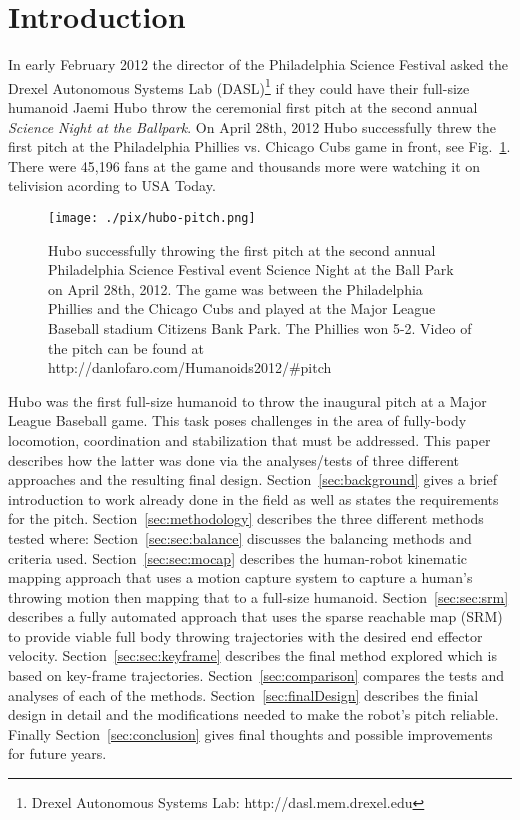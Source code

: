 \section{Introduction}
In early February 2012 the director of the Philadelphia Science Festival asked the Drexel Autonomous Systems Lab (DASL)\footnote{Drexel Autonomous Systems Lab: http://dasl.mem.drexel.edu}\label{foot:dasl} if they could have their full-size humanoid Jaemi Hubo throw the ceremonial first pitch at the second annual \textit{Science Night at the Ballpark}.  
On April 28th, 2012 Hubo successfully threw the first pitch at the Philadelphia Phillies vs. Chicago Cubs game in front, see Fig.~\ref{fig:hubo-throw}.
There were 45,196 fans at the game and thousands more were watching it on telivision acording to USA Today.

\begin{figure}[t]
  \centering
\texttt{[image: ./pix/hubo-pitch.png]}
  \caption{Hubo successfully throwing the first pitch at the second annual Philadelphia Science Festival event Science Night at the Ball Park on April 28th, 2012.  The game was between the Philadelphia Phillies and the Chicago Cubs and played at the Major League Baseball stadium Citizens Bank Park.  The Phillies won 5-2.  Video of the pitch can be found at http://danlofaro.com/Humanoids2012/\#pitch}
  \label{fig:hubo-throw}
\end{figure}



Hubo was the first full-size humanoid to throw the inaugural pitch at a Major League Baseball game.  
This task poses challenges in the area of fully-body locomotion, coordination and stabilization that must be addressed.
This paper describes how the latter was done via the analyses/tests of three different approaches and the resulting final design.
Section~\ref{sec:background} gives a brief introduction to work already done in the field as well as states the requirements for the pitch.
Section~\ref{sec:methodology} describes the three different methods tested where:
Section~\ref{sec:sec:balance} discusses the balancing methods and criteria used.
Section~\ref{sec:sec:mocap} describes the human-robot kinematic mapping approach that uses a motion capture system to capture a human's throwing motion then mapping that to a full-size humanoid.  
Section~\ref{sec:sec:srm} describes a fully automated approach that uses the sparse reachable map (SRM) to provide viable full body throwing trajectories with the desired end effector velocity\cite{dlofaro-srm}.
Section~\ref{sec:sec:keyframe} describes the final method explored which is based on key-frame trajectories.
Section~\ref{sec:comparison} compares the tests and analyses of each of the methods.
Section~\ref{sec:finalDesign} describes the finial design in detail and the modifications needed to make the robot's pitch reliable.
Finally Section~\ref{sec:conclusion} gives final thoughts and possible improvements for future years.


